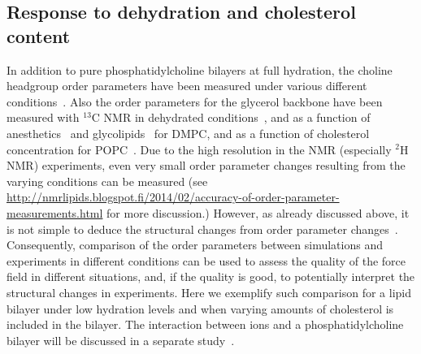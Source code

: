 \documentclass[pre,aps,floatfix,authordate1-4,twocolumn]{revtex4-1}
\begin{document}
\subsection{Response to dehydration and cholesterol content}
In addition to pure phosphatidylcholine bilayers at full hydration, the choline headgroup order parameters
have been measured under various different conditions~\cite{gally75,brown77,brown78,akutsu81,altenbach84,scherer89,bechinger91,ulrich94,dvinskikh05b,castro08,kapla12,ferreira13}.
Also the order parameters for the glycerol backbone have been measured with $^{13}$C NMR in dehydrated conditions~\cite{dvinskikh05b}, and as a function 
of anesthetics~\cite{castro08} and glycolipids~\cite{kapla12} for DMPC, and as a function of cholesterol 
concentration for POPC~\cite{ferreira13}. Due to the high resolution in the NMR (especially $^2$H NMR) experiments,
even very small order parameter changes resulting from the varying conditions can be measured (see
\url{http://nmrlipids.blogspot.fi/2014/02/accuracy-of-order-parameter-measurements.html}
for more discussion.)
However, as already discussed above, it is not simple to deduce 
the structural changes from order parameter changes~\cite{akutsu91,semchyschyn04}. Consequently, comparison of the order parameters
between simulations and experiments in different conditions can be used to assess the quality of the force field 
in different situations, and, if the quality is good, to potentially interpret the structural changes in experiments.
Here we exemplify such comparison for a lipid bilayer under low hydration levels and when varying amounts of cholesterol is included in the bilayer. 
The interaction between ions and a phosphatidylcholine bilayer will be discussed in a separate study~\cite{ionpaper}.
\end{document}
